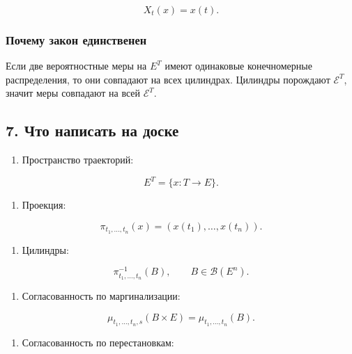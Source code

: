 \documentclass[
  11pt,
  a4paper,
]{article}
\providecommand{\tightlist}{%
  \setlength{\itemsep}{0pt}\setlength{\parskip}{0pt}}
\begin{document}
\[
X_t(x)=x(t).
\]

\subsubsection{Почему закон
единственен}\label{ux43fux43eux447ux435ux43cux443-ux437ux430ux43aux43eux43d-ux435ux434ux438ux43dux441ux442ux432ux435ux43dux435ux43d}

Если две вероятностные меры на \(E^T\) имеют одинаковые конечномерные
распределения, то они совпадают на всех цилиндрах. Цилиндры порождают
\(\mathcal E^T\), значит меры совпадают на всей \(\mathcal E^T\).

\subsection{7. Что написать на
доске}\label{ux447ux442ux43e-ux43dux430ux43fux438ux441ux430ux442ux44c-ux43dux430-ux434ux43eux441ux43aux435}

\begin{enumerate}
\def\labelenumi{\arabic{enumi}.}
\tightlist
\item
  Пространство траекторий:
\end{enumerate}

\[
E^T=\{x:T\to E\}.
\]

\begin{enumerate}
\def\labelenumi{\arabic{enumi}.}
\setcounter{enumi}{1}
\tightlist
\item
  Проекция:
\end{enumerate}

\[
\pi_{t_1,\ldots,t_n}(x)=(x(t_1),\ldots,x(t_n)).
\]

\begin{enumerate}
\def\labelenumi{\arabic{enumi}.}
\setcounter{enumi}{2}
\tightlist
\item
  Цилиндры:
\end{enumerate}

\[
\pi_{t_1,\ldots,t_n}^{-1}(B),
\qquad
B\in\mathcal B(E^n).
\]

\begin{enumerate}
\def\labelenumi{\arabic{enumi}.}
\setcounter{enumi}{3}
\tightlist
\item
  Согласованность по маргинализации:
\end{enumerate}

\[
\mu_{t_1,\ldots,t_n,s}(B\times E)
=
\mu_{t_1,\ldots,t_n}(B).
\]

\begin{enumerate}
\def\labelenumi{\arabic{enumi}.}
\setcounter{enumi}{4}
\tightlist
\item
  Согласованность по перестановкам:
\end{enumerate}
\end{document}
